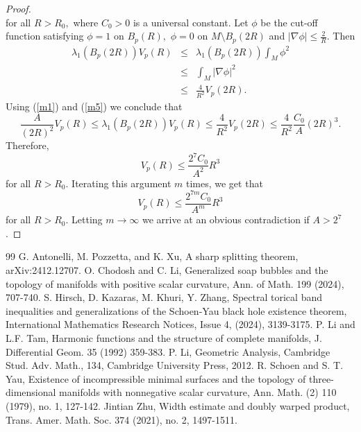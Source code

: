 \documentclass[10pt,a4paper]{amsart}
\numberwithin{equation}{section}
\begin{document}
\begin{proof}
\begin{equation}
\end{equation}%
for all $R>R_{0},$ where $C_{0}>0$ is a universal constant. Let $\phi$ be 
the cut-off function satisfying $\phi =1$ on $B_{p}\left( R\right),$ $\phi =0$
on $M\setminus B_{p}\left( 2R\right) $ and $\left\vert \nabla \phi
\right\vert \leq \frac{2}{R}.$ Then
\begin{eqnarray*}
\lambda _{1}\left( B_{p}\left( 2R\right) \right) V_{p}\left( R\right)  &\leq
&\lambda _{1}\left( B_{p}\left( 2R\right) \right) \int_{M}\phi ^{2} \\
&\leq &\int_{M}\left\vert \nabla \phi \right\vert ^{2} \\
&\leq &\frac{4}{R^{2}}V_{p}\left( 2R\right).
\end{eqnarray*}%
Using (\ref{m1}) and (\ref{m5}) we conclude that 
\begin{equation*}
\frac{A}{(2R)^{2}}V_{p}\left( R\right) \leq \lambda _{1}\left( B_{p}\left(
2R\right) \right) V_{p}\left( R\right) \leq \frac{4}{R^{2}}V_{p}\left(
2R\right) \leq \frac{4}{R^{2}}\frac{C_{0}}{A}\left( 2R\right) ^{3}.
\end{equation*}%
Therefore,
\begin{equation*}
V_{p}\left( R\right) \leq \frac{2^7 C_{0}}{A^{2}}R^{3}
\end{equation*}%
for all $R>R_{0}.$ Iterating this argument $m$ times, we get
that 
\begin{equation*}
V_{p}\left( R\right) \leq \frac{2^{7m}C_{0}}{A^{m}}R^{3}
\end{equation*}%
for all $R>R_{0}.$ Letting $m\rightarrow \infty $ we arrive at an obvious contradiction if $A>2^7$.
\end{proof}


\begin{thebibliography}{99}
 G. Antonelli, M. Pozzetta, and K. Xu, A sharp splitting theorem, arXiv:2412.12707.
 O. Chodosh and C. Li, Generalized soap bubbles and the topology of manifolds with positive scalar curvature, Ann. of Math. 199 (2024), 707-740.
 S. Hirsch, D. Kazaras, M. Khuri, Y. Zhang, Spectral torical band inequalities and generalizations of the Schoen-Yau black hole existence theorem, International Mathematics Research Notices, Issue 4, (2024), 3139-3175.
 P. Li and L.F. Tam, Harmonic functions and the structure of complete manifolds, J. Differential Geom. 35 (1992) 359-383.
 P. Li, Geometric Analysis, Cambridge Stud. Adv. Math., 134, Cambridge University Press, 2012.
 R. Schoen and S. T. Yau, Existence of incompressible minimal surfaces and the topology of three-dimensional manifolds with nonnegative scalar curvature, Ann. Math. (2) 110 (1979), no. 1, 127-142.
 Jintian Zhu, Width estimate and doubly warped product, Trans. Amer. Math. Soc. 374 (2021), no. 2, 1497-1511.
\end{thebibliography}
\end{document}
